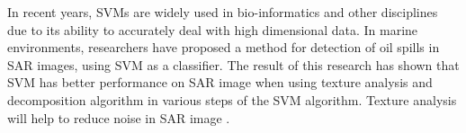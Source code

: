 In recent years, SVMs are widely used in bio-informatics \cite{furey2000support,osuna1997training,guyon2002gene} and other disciplines due to its ability to accurately deal with high dimensional data\cite{joachims1998text}. In marine environments, researchers have proposed a method for detection of oil spills in SAR images, using SVM  as a classifier. 
The result of this research has shown that SVM has better performance on SAR image when using texture analysis and decomposition algorithm in various steps of the SVM algorithm. Texture analysis will help to reduce noise in SAR image \cite{matkan2013oil}.
